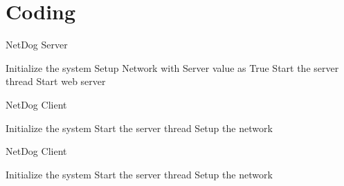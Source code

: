\chapter{Coding}

\begin{algorithm}
\begin{algorithmic}[1]
\caption{NetDog Server}
\State Initialize the system 
\State Setup Network with Server value as True
\State Start the server thread
\State Start web server
\end{algorithmic}
\end{algorithm}

\begin{algorithm}
\begin{algorithmic}[1]
\caption{NetDog Client}
\State Initialize the system 
\State Start the server thread
\State Setup the network
\end{algorithmic}
\end{algorithm}

\begin{algorithm}
\begin{algorithmic}[1]
\caption{NetDog Client}
\State Initialize the system 
\State Start the server thread
\State Setup the network
\end{algorithmic}
\end{algorithm}

